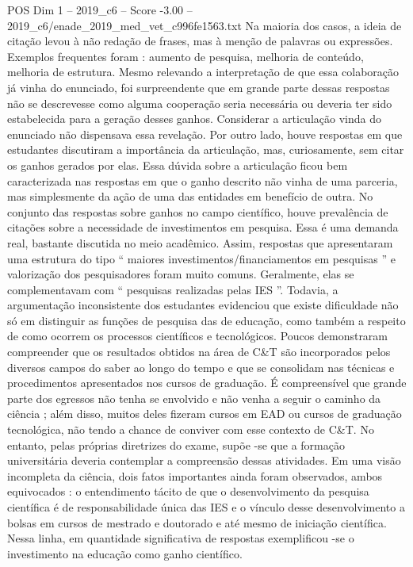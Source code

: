\begin{textsample}{POS Dim 1 – 2019\_c6 – Score -3.00 – 2019\_c6/enade\_2019\_med\_vet\_c996fe1563.txt}
Na maioria dos casos, a ideia de citação levou à não redação de frases, mas à menção de palavras ou expressões.
Exemplos frequentes foram : aumento de pesquisa, melhoria de conteúdo, melhoria de estrutura.
Mesmo relevando a interpretação de que essa colaboração já vinha do enunciado, foi surpreendente que em grande parte dessas respostas não se descrevesse como alguma cooperação seria necessária ou deveria ter sido estabelecida para a geração desses ganhos.
Considerar a articulação vinda do enunciado não dispensava essa revelação.
Por outro lado, houve respostas em que estudantes discutiram a importância da articulação, mas, curiosamente, sem citar os ganhos gerados por elas.
Essa dúvida sobre a articulação ficou bem caracterizada nas respostas em que o ganho descrito não vinha de uma parceria, mas simplesmente da ação de uma das entidades em benefício de outra.
No conjunto das respostas sobre ganhos no campo científico, houve prevalência de citações sobre a necessidade de investimentos em pesquisa.
Essa é uma demanda real, bastante discutida no meio acadêmico.
Assim, respostas que apresentaram uma estrutura do tipo “ maiores investimentos/financiamentos em pesquisas ” e valorização dos pesquisadores foram muito comuns.
Geralmente, elas se complementavam com “ pesquisas realizadas pelas IES ”.
Todavia, a argumentação inconsistente dos estudantes evidenciou que existe dificuldade não só em distinguir as funções de pesquisa das de educação, como também a respeito de como ocorrem os processos científicos e tecnológicos.
Poucos demonstraram compreender que os resultados obtidos na área de C\&T são incorporados pelos diversos campos do saber ao longo do tempo e que se consolidam nas técnicas e procedimentos apresentados nos cursos de graduação.
É compreensível que grande parte dos egressos não tenha se envolvido e não venha a seguir o caminho da ciência ; além disso, muitos deles fizeram cursos em EAD ou cursos de graduação tecnológica, não tendo a chance de conviver com esse contexto de C\&T.
No entanto, pelas próprias diretrizes do exame, supõe -se que a formação universitária deveria contemplar a compreensão dessas atividades.
Em uma visão incompleta da ciência, dois fatos importantes ainda foram observados, ambos equivocados : o entendimento tácito de que o desenvolvimento da pesquisa científica é de responsabilidade única das IES e o vínculo desse desenvolvimento a bolsas em cursos de mestrado e doutorado e até mesmo de iniciação científica.
Nessa linha, em quantidade significativa de respostas exemplificou -se o investimento na educação como ganho científico.

\end{textsample}
